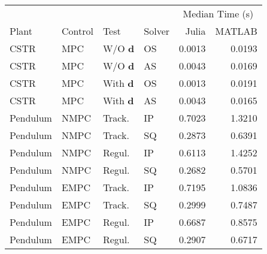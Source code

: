 \begin{tabular}{llllrr}
	
\toprule %

	  &	& & & \multicolumn{2}{c}{Median Time (s)} \\ \cmidrule(l){5-6}
Plant & Control & Test & Solver & Julia & MATLAB \\
\midrule %

CSTR		& MPC	& W/O $\mathbf{d}$	& OS & \num{0.0013} & \num{0.0193}	\\
CSTR		& MPC	& W/O $\mathbf{d}$	& AS & \num{0.0043} & \num{0.0169}	\\
CSTR		& MPC	& With $\mathbf{d}$ & OS & \num{0.0013} & \num{0.0191}	\\
CSTR		& MPC	& With $\mathbf{d}$ & AS & \num{0.0043} & \num{0.0165}	\\
Pendulum 	& NMPC	& Track. 	   		& IP & \num{0.7023} & \num{1.3210}	\\
Pendulum 	& NMPC	& Track. 	   		& SQ & \num{0.2873} & \num{0.6391}	\\
Pendulum    & NMPC	& Regul. 			& IP & \num{0.6113} & \num{1.4252} 	\\
Pendulum    & NMPC	& Regul. 			& SQ & \num{0.2682} & \num{0.5701} 	\\
Pendulum    & EMPC	& Track.			& IP & \num{0.7195} & \num{1.0836} 	\\
Pendulum    & EMPC	& Track.			& SQ & \num{0.2999} & \num{0.7487} 	\\
Pendulum	& EMPC	& Regul. 			& IP & \num{0.6687} & \num{0.8575} 	\\
Pendulum	& EMPC	& Regul. 			& SQ & \num{0.2907} & \num{0.6717}  \\
	
\bottomrule %
	
\end{tabular}